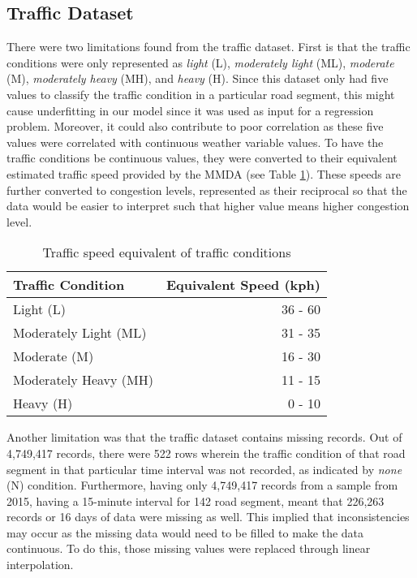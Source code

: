 \subsection{Traffic Dataset}
There were two limitations found from the traffic dataset. First is that the traffic conditions were only represented as \textit{light} (L), \textit{moderately light} (ML), \textit{moderate} (M), \textit{moderately heavy} (MH), and \textit{heavy} (H). Since this dataset only had five values to classify the traffic condition in a particular road segment, this might cause underfitting in our model since it was used as input for a regression problem. Moreover, it could also contribute to poor correlation as these five values were correlated with continuous weather variable values. To have the traffic conditions be continuous values, they were converted to their equivalent estimated traffic speed provided by the MMDA (see Table \ref{table_traffic_condition}). These speeds are further converted to congestion levels, represented as their reciprocal so that the data would be easier to interpret such that higher value means higher congestion level.

\begin{table}[h]
\centering
\caption{Traffic speed equivalent of traffic conditions}
\label{table_traffic_condition}
\begin{tabular}{|l|r|}
\hline
\textbf{Traffic Condition} & \multicolumn{1}{l|}{\textbf{Equivalent Speed (kph)}} \\ \hline
Light (L)                  & 36 - 60                                             \\ \hline
Moderately Light (ML)                  & 31 - 35                                            \\ \hline
Moderate (M)               & 16 - 30                                             \\ \hline
Moderately Heavy (MH)                  & 11 - 15                                             \\ \hline
Heavy (H)                  & 0 - 10                                              \\ \hline
\end{tabular}
\end{table}

Another limitation was that the traffic dataset contains missing records. Out of 4,749,417 records, there were 522 rows wherein the traffic condition of that road segment in that particular time interval was not recorded, as indicated by \textit{none} (N) condition. Furthermore, having only 4,749,417 records from a sample from 2015, having a 15-minute interval for 142 road segment, meant that 226,263 records or 16 days of data were missing as well. This implied that inconsistencies may occur as the missing data would need to be filled to make the data continuous. To do this, those missing values were replaced through linear interpolation.

